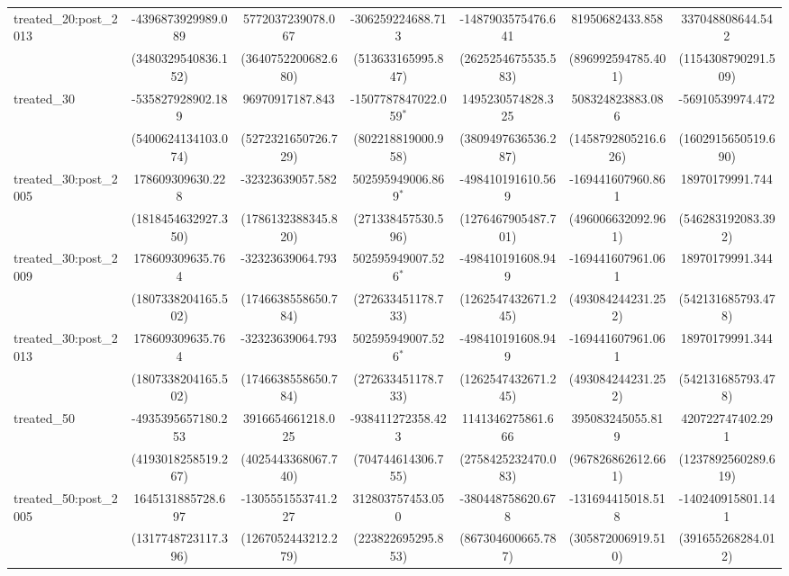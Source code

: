 \begin{table}[!htbp]
\begin{tabular}{@{\extracolsep{5pt}}lcccccc}
 treated_20:post_2013 & -4396873929989.089$^{}$ & 5772037239078.067$^{}$ & -306259224688.713$^{}$ & -1487903575476.641$^{}$ & 81950682433.858$^{}$ & 337048808644.542$^{}$ \\
  & (3480329540836.152) & (3640752200682.680) & (513633165995.847) & (2625254675535.583) & (896992594785.401) & (1154308790291.509) \\
 treated_30 & -535827928902.189$^{}$ & 96970917187.843$^{}$ & -1507787847022.059$^{*}$ & 1495230574828.325$^{}$ & 508324823883.086$^{}$ & -56910539974.472$^{}$ \\
  & (5400624134103.074) & (5272321650726.729) & (802218819000.958) & (3809497636536.287) & (1458792805216.626) & (1602915650519.690) \\
 treated_30:post_2005 & 178609309630.228$^{}$ & -32323639057.582$^{}$ & 502595949006.869$^{*}$ & -498410191610.569$^{}$ & -169441607960.861$^{}$ & 18970179991.744$^{}$ \\
  & (1818454632927.350) & (1786132388345.820) & (271338457530.596) & (1276467905487.701) & (496006632092.961) & (546283192083.392) \\
 treated_30:post_2009 & 178609309635.764$^{}$ & -32323639064.793$^{}$ & 502595949007.526$^{*}$ & -498410191608.949$^{}$ & -169441607961.061$^{}$ & 18970179991.344$^{}$ \\
  & (1807338204165.502) & (1746638558650.784) & (272633451178.733) & (1262547432671.245) & (493084244231.252) & (542131685793.478) \\
 treated_30:post_2013 & 178609309635.764$^{}$ & -32323639064.793$^{}$ & 502595949007.526$^{*}$ & -498410191608.949$^{}$ & -169441607961.061$^{}$ & 18970179991.344$^{}$ \\
  & (1807338204165.502) & (1746638558650.784) & (272633451178.733) & (1262547432671.245) & (493084244231.252) & (542131685793.478) \\
 treated_50 & -4935395657180.253$^{}$ & 3916654661218.025$^{}$ & -938411272358.423$^{}$ & 1141346275861.666$^{}$ & 395083245055.819$^{}$ & 420722747402.291$^{}$ \\
  & (4193018258519.267) & (4025443368067.740) & (704744614306.755) & (2758425232470.083) & (967826862612.661) & (1237892560289.619) \\
 treated_50:post_2005 & 1645131885728.697$^{}$ & -1305551553741.227$^{}$ & 312803757453.050$^{}$ & -380448758620.678$^{}$ & -131694415018.518$^{}$ & -140240915801.141$^{}$ \\
  & (1317748723117.396) & (1267052443212.279) & (223822695295.853) & (867304600665.787) & (305872006919.510) & (391655268284.012) \\

\end{tabular}
\end{table}
